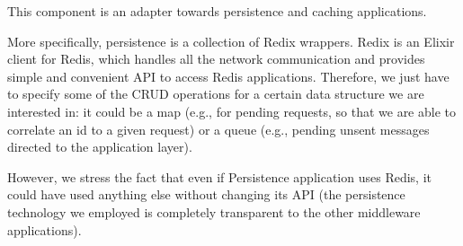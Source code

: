 
This component is an adapter towards persistence and caching applications.

More specifically, persistence is a collection of Redix wrappers. Redix is an
Elixir client for Redis, which handles all the network communication and
provides simple and convenient API to access Redis applications.
Therefore, we just have to specify some of the CRUD operations for a certain
data structure we are interested in: it could be a map (e.g., for pending
requests, so that we are able to correlate an id to a given request) or a
queue (e.g., pending unsent messages directed to the application layer).

However, we stress the fact that even if Persistence application uses Redis, it
could have used anything else without changing its API (the persistence
technology we employed is completely transparent to the other middleware
applications).
